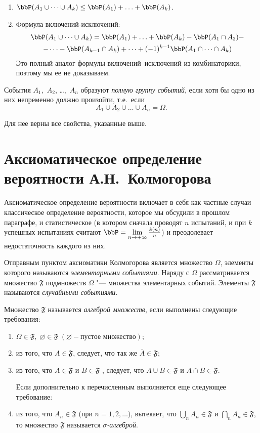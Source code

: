 \begin{enumerate}
\item
$\bbP(A_1\cup\dots\cup A_k) \le \bbP(A_1)+\ldots+\bbP(A_k)$.

\item Формула вклю\-чений-исключений:
\begin{multline*}
\bbP(A_1\cup\dots\cup A_k)= \bbP(A_1)+\ldots+\bbP(A_k)-\bbP(A_1\cap A_2)-\\-\dots -\bbP(A_{k-1}\cap A_{k})+ \dots + (-1)^{k-1}\bbP(A_1\cap\dots\cap A_k)
\end{multline*}
Это полный аналог формулы вклю\-чений--исключений из комбинаторики, поэтому мы ее не доказываем.
\end{enumerate}

\begin{defn}
События $A_1$,~$A_2$, \dots,~$A_n$ образуют \textit{полную группу событий}, если хотя бы одно из них непременно должно произойти, т.е.~если
$$
A_1\cup A_2\cup\dots\cup A_n=\Omega.
$$
\end{defn}
Для нее верны все свойства, указанные выше.
\section{Аксиоматическое определение вероятности А.Н.~Колмогорова}

Аксиоматическое определение вероятности включает в себя как частные случаи классическое определение вероятности, которое мы обсудили в прошлом параграфе, и статистическое (в котором сначала проводят $n$ испытаний, и при $k$ успешных испытаниях считают $\bbP=\lim_{n \to +\infty}\limits\frac{k(n)}{n}$) и преодолевает недостаточность каждого из них.

Отправным пунктом аксиоматики Колмогорова является множество $\Omega$, элементы которого называются \textit{элементарными событиями}. Наряду с $\Omega$ рассматривается множество $\mathfrak{F}$ подмножеств $\Omega$ "--- множества элементарных событий. Элементы $\mathfrak{F}$ называются \textit{случайными событиями.}
\begin{defn} Множество $\mathfrak{F}$ называется \textit{алгеброй множеств}, если выполнены следующие требования:
\begin{enumerate}
\item
$\Omega \in \mathfrak{F},\; \varnothing \in \mathfrak{F} \;(\varnothing - \text{пустое множество});$
\item
из того, что $A \in \mathfrak{F}$, следует, что так же $\overline{A} \in \mathfrak{F}$;
\item
из того, что  $A \in \mathfrak{F}$ и $B \in \mathfrak{F}$ , следует, что $A \cup B \in \mathfrak{F}$ и $A \cap B \in \mathfrak{F}$.

Если дополнительно к перечисленным выполняется еще следующее требование:
\item
из того, что $A_n \in \mathfrak{F}$ (при $n = 1,2, \ldots$), вытекает, что $\bigcup\limits_{n} A_n \in \mathfrak{F}$ и $\bigcap\limits_{n} A_n \in \mathfrak{F}$, то множество $\mathfrak{F}$ называется \textit{$\sigma$-алгеброй}. 
\end{enumerate}
\end{defn}

